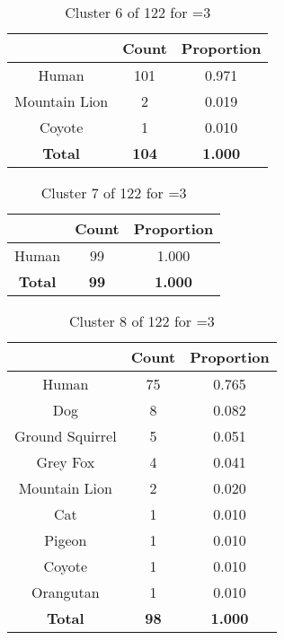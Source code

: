 \begin{table}[ht!]
\centering
\begin{tabular}{|c|c|c|}
\hline
\bf \Spec{} &\bf Count &\bf Proportion\\ \hline \hline
Human & 101 & 0.971\\ \hline
Mountain Lion & 2 & 0.019\\ \hline
Coyote & 1 & 0.010\\ \hline
\hline
\bf Total & \bf 104 & \bf 1.000\\ \hline
\end{tabular}
\label{tab:cluster:6:3}
\caption{Cluster 6 of 122 for \minneigh{}=3}
\end{table}

\begin{table}[ht!]
\centering
\begin{tabular}{|c|c|c|}
\hline
\bf \Spec{} &\bf Count &\bf Proportion\\ \hline \hline
Human & 99 & 1.000\\ \hline
\hline
\bf Total & \bf 99 & \bf 1.000\\ \hline
\end{tabular}
\label{tab:cluster:7:3}
\caption{Cluster 7 of 122 for \minneigh{}=3}
\end{table}

\begin{table}[ht!]
\centering
\begin{tabular}{|c|c|c|}
\hline
\bf \Spec{} &\bf Count &\bf Proportion\\ \hline \hline
Human & 75 & 0.765\\ \hline
Dog & 8 & 0.082\\ \hline
Ground Squirrel & 5 & 0.051\\ \hline
Grey Fox & 4 & 0.041\\ \hline
Mountain Lion & 2 & 0.020\\ \hline
Cat & 1 & 0.010\\ \hline
Pigeon & 1 & 0.010\\ \hline
Coyote & 1 & 0.010\\ \hline
Orangutan & 1 & 0.010\\ \hline
\hline
\bf Total & \bf 98 & \bf 1.000\\ \hline
\end{tabular}
\label{tab:cluster:8:3}
\caption{Cluster 8 of 122 for \minneigh{}=3}
\end{table}

